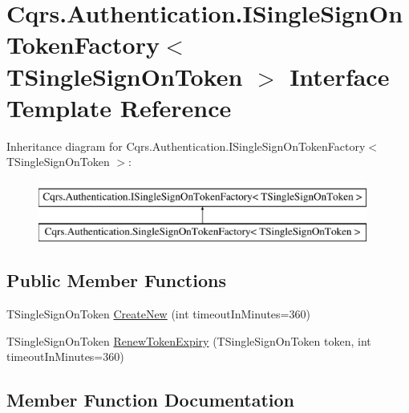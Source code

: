 \hypertarget{interfaceCqrs_1_1Authentication_1_1ISingleSignOnTokenFactory}{}\section{Cqrs.\+Authentication.\+I\+Single\+Sign\+On\+Token\+Factory$<$ T\+Single\+Sign\+On\+Token $>$ Interface Template Reference}
\label{interfaceCqrs_1_1Authentication_1_1ISingleSignOnTokenFactory}
Inheritance diagram for Cqrs.\+Authentication.\+I\+Single\+Sign\+On\+Token\+Factory$<$ T\+Single\+Sign\+On\+Token $>$\+:\begin{figure}[H]
\begin{center}
\leavevmode
\includegraphics[height=2.000000cm]{interfaceCqrs_1_1Authentication_1_1ISingleSignOnTokenFactory}
\end{center}
\end{figure}
\subsection*{Public Member Functions}
\begin{DoxyCompactItemize}
\item 
T\+Single\+Sign\+On\+Token \hyperlink{interfaceCqrs_1_1Authentication_1_1ISingleSignOnTokenFactory_ad0795fb60ca13dd24db18556089e2834_ad0795fb60ca13dd24db18556089e2834}{Create\+New} (int timeout\+In\+Minutes=360)
\item 
T\+Single\+Sign\+On\+Token \hyperlink{interfaceCqrs_1_1Authentication_1_1ISingleSignOnTokenFactory_ab436004ad1631140f7a58927cbacd8c4_ab436004ad1631140f7a58927cbacd8c4}{Renew\+Token\+Expiry} (T\+Single\+Sign\+On\+Token token, int timeout\+In\+Minutes=360)
\end{DoxyCompactItemize}


\subsection{Member Function Documentation}
\mbox{\label{interfaceCqrs_1_1Authentication_1_1ISingleSignOnTokenFactory_ad0795fb60ca13dd24db18556089e2834_ad0795fb60ca13dd24db18556089e2834}} 
